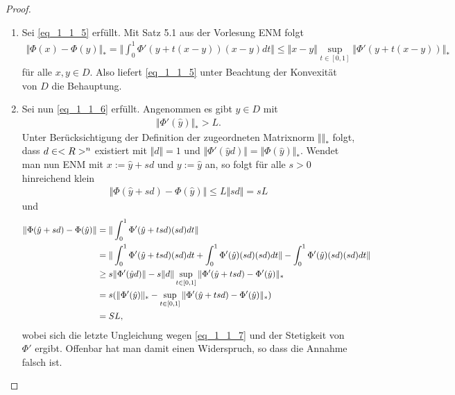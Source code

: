 \begin{proof}
	\begin{enumerate}
		\item Sei \ref{eq_1_1_5} erfüllt. Mit Satz 5.1 aus der Vorlesung ENM folgt %
		\begin{align}
		\Vert \Phi(x) - \Phi(y) \Vert_{\ast} = \Vert \int_{0}^{1} \Phi'(y + t(x-y))(x-y) dt \Vert \le \Vert x-y \Vert \sup_{t \in [0,1]} \Vert \Phi'(y+t(x-y))\Vert_{\ast}
		\end{align}
		für alle $x,y \in D$. Also liefert \ref{eq_1_1_5} unter Beachtung der Konvexität von $D$ die Behauptung.
		\item Sei nun \ref{eq_1_1_6} erfüllt. Angenommen es gibt $\hat{y} \in D$ mit
		\begin{align}
		\Vert \Phi'(\hat{y})\Vert_{\ast} > L. \label{eq_1_1_7}
		\end{align}
		Unter Berücksichtigung der Definition der zugeordneten Matrixnorm $\Vert \Vert_{\ast}$ folgt, dass $d \in <R>^n$ existiert mit $\Vert d \Vert = 1$ und $\Vert \Phi'(\hat{y}d)\Vert = \Vert \Phi(\hat{y}) \Vert_{\ast}$. Wendet man nun ENM mit $x := \hat{y} + sd$ und $y := \hat{y}$ an, so folgt für alle $s > 0$ hinreichend klein
		\begin{align}
		\Vert \Phi(\hat{y} + sd) - \Phi(\hat{y})\Vert \le L \Vert sd \Vert = sL
		\end{align}
		und 
		\begin{align}
		\Vert \Phi(\hat{y} + sd) - \Phi(\hat{y})\Vert &= \Vert \int_{0}^{1} \Phi'(\hat{y} + tsd)(sd)dt\Vert\notag \\
		&= \Vert \int_{0}^{1} \Phi'(\hat{y} + tsd)(sd)dt + \int_{0}^{1} \Phi'(\hat{y})(sd)(sd)dt\Vert - \int_{0}^{1} \Phi'(\hat{y})(sd)(sd)dt\Vert\notag \\
		&\ge s\Vert \Phi'(\hat{y}d)\Vert - s\Vert d\Vert \sup_{t \in [0,1]}\Vert\Phi'(\hat{y} + tsd) - \Phi'(\hat{y})\Vert_{\ast} \notag \\
		&= s (\Vert \Phi'(\hat{y}) \Vert_{\ast} - \sup_{t \in [0,1]}\Vert\Phi'(\hat{y} + tsd) - \Phi'(\hat{y})\Vert_{\ast}) \notag\\
		&= SL, \notag
		\end{align}
		wobei sich die letzte Ungleichung wegen \ref{eq_1_1_7} und der Stetigkeit von $\Phi'$ ergibt. Offenbar hat man damit einen Widerspruch, so dass die Annahme falsch ist.
	\end{enumerate}
\end{proof}

